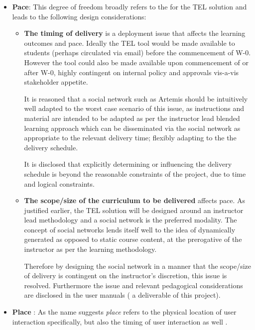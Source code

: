 \begin{itemize}[\null]

\item \textbf{Pace}: This degree of freedom broadly refers to the   \cite{Gordon2014} for the TEL solution and leads to the following design considerations:

\begin{itemize}
\item \textbf{The timing of delivery} is a deployment issue that affects the learning outcomes and pace. Ideally the TEL tool would be made available to students (perhaps circulated via email) before the commencement of W-0. However the tool could also be made available upon commencement of or after W-0, highly contingent on internal policy and approvals vis-a-vis stakeholder appetite.

 It is reasoned that a social network such as Artemis should be intuitively well adapted to the worst case scenario of this issue, as instructions and material are intended to be adapted as per the instructor lead blended learning approach which can be disseminated via the social network as appropriate to the relevant delivery time; flexibly adapting to the the delivery schedule. 
 
 It is disclosed that explicitly determining or influencing the delivery schedule is beyond the reasonable constraints of the project, due to time and logical constraints.

\item \textbf{The scope/size of the curriculum to be delivered} affects pace. As justified earlier, the TEL solution will be designed around an instructor lead methodology and a social network is the preferred modality. The concept of social networks lends itself  well to the idea of dynamically generated as opposed to static course content, at the prerogative of the instructor as per the learning methodology.

Therefore by  designing the social network in a manner that the scope/size of delivery is contingent on the instructor's discretion, this issue is resolved. Furthermore the issue and relevant pedagogical considerations are disclosed in the user manuals ( a deliverable of this project).

\end{itemize}

\item \textbf{Place} : As the name suggests \textit{place} refers to the physical location of user interaction specifically, but also the timing of user interaction as well \cite{Gordon2014}.


\end{itemize}
